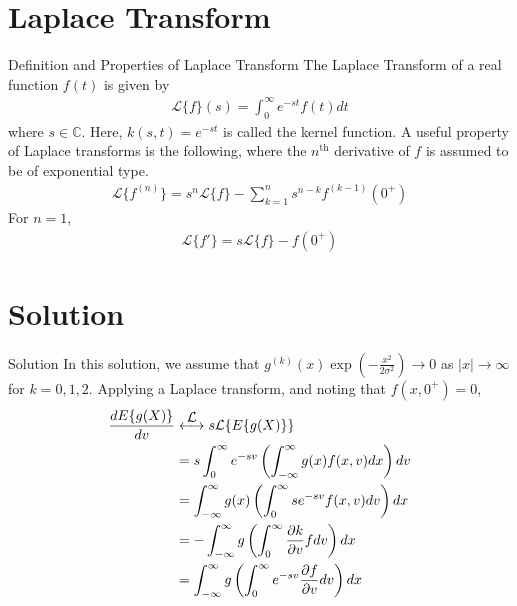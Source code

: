 \documentclass{beamer}
\newcommand\laplace{\ensuremath{\stackrel{\mathclap{\mbox{$\mathcal{L}$}}}{\longleftrightarrow}}}
\begin{document}
\section{Laplace Transform}
\begin{frame}{Definition and Properties of Laplace Transform}
	The Laplace Transform of a real function $f(t)$ is given by
	\begin{align}
		\mathcal{L}\{f\}(s) = \int_{0}^{\infty}e^{-st}f(t)dt  
		\label{eq:lap}
	\end{align}
	where $s \in \mathbb{C}$. Here, $k(s, t) = e^{-st}$ is called the kernel function. A useful property of Laplace transforms is the following, where the $n^{\text{th}}$ derivative of $f$ is assumed to be of exponential type.
	\begin{align}
		\mathcal{L}\{f^{(n)}\} = s^{n}\mathcal{L}\{f\} - \sum_{k = 1}^{n}s^{n - k}f^{(k - 1)}(0^+)
		\label{eq:lap-diff}
	\end{align}
	For $n = 1$,
	\begin{align}
		\mathcal{L}\{f'\} = s\mathcal{L}\{f\} - f(0^+)
		\label{eq:lap-diff-one}
	\end{align}
\end{frame}

\section{Solution}
\begin{frame}{Solution}
	In this solution, we assume that $g^{(k)}(x)\exp{(-\frac{x^2}{2\sigma^2})} \to 0$ as $|x| \to \infty$ for $k = 0, 1, 2$. Applying a Laplace transform, and noting that $f(x, 0^+) = 0$,
	\begin{align}
		\frac{dE\{g(X)\}}{dv} &\laplace s\mathcal{L}\{E\{g(X)\}\} \\
		&= s\int_{0}^{\infty}e^{-sv}\left(\int_{-\infty}^{\infty}g(x)f(x, v)dx\right)dv \\
		&= \int_{-\infty}^{\infty}g(x)\left(\int_{0}^{\infty}se^{-sv}f(x, v)dv\right)dx \\
		&= -\int_{-\infty}^{\infty}g\left(\int_{0}^{\infty}\frac{\partial k}{\partial v}fdv\right)dx \label{eq:part} \\
		&= \int_{-\infty}^{\infty}g\left(\int_{0}^{\infty}e^{-sv}\frac{\partial f}{\partial v}dv\right)dx
		\label{eq:sol1-1}
	\end{align}
\end{frame}
\end{document}
